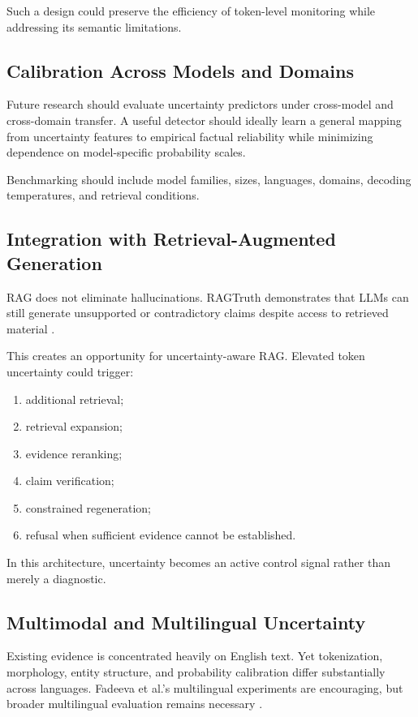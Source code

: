 \documentclass[11pt]{article}
\begin{document}
Such a design could preserve the efficiency of token-level monitoring while addressing its semantic limitations.

\subsection{Calibration Across Models and Domains}
\label{sec:cross-model}

Future research should evaluate uncertainty predictors under cross-model and cross-domain transfer. A useful detector should ideally learn a general mapping from uncertainty features to empirical factual reliability while minimizing dependence on model-specific probability scales.

Benchmarking should include model families, sizes, languages, domains, decoding temperatures, and retrieval conditions.

\subsection{Integration with Retrieval-Augmented Generation}
\label{sec:rag}

RAG does not eliminate hallucinations. RAGTruth demonstrates that LLMs can still generate unsupported or contradictory claims despite access to retrieved material \cite{niu2024}.

This creates an opportunity for uncertainty-aware RAG. Elevated token uncertainty could trigger:

\begin{enumerate}
    \item additional retrieval;
    \item retrieval expansion;
    \item evidence reranking;
    \item claim verification;
    \item constrained regeneration;
    \item refusal when sufficient evidence cannot be established.
\end{enumerate}

In this architecture, uncertainty becomes an active control signal rather than merely a diagnostic.

\subsection{Multimodal and Multilingual Uncertainty}
\label{sec:multimodal}

Existing evidence is concentrated heavily on English text. Yet tokenization, morphology, entity structure, and probability calibration differ substantially across languages. Fadeeva et al.'s multilingual experiments are encouraging, but broader multilingual evaluation remains necessary \cite{fadeeva2024}.
\end{document}
